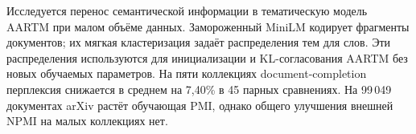 Исследуется перенос семантической информации в тематическую модель AARTM при малом объёме данных. Замороженный MiniLM кодирует фрагменты документов; их мягкая кластеризация задаёт распределения тем для слов. Эти распределения используются для инициализации и KL-согласования AARTM без новых обучаемых параметров. На пяти коллекциях document-completion перплексия снижается в среднем на 7,40\% в 45 парных сравнениях. На 99\,049 документах arXiv растёт обучающая PMI, однако общего улучшения внешней NPMI на малых коллекциях нет.
